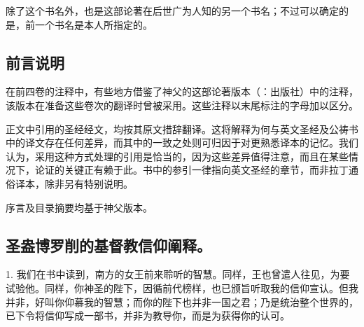 除了这个书名外，也是这部论著在后世广为人知的另一个书名；不过可以确定的是，前一个书名是本人所指定的。\par


\subsection{前言说明}

在前四卷的注释中，有些地方借鉴了神父的这部论著版本（：出版社）中的注释，该版本在准备这些卷次的翻译时曾被采用。这些注释以末尾标注的字母加以区分。\par

正文中引用的圣经经文，均按其原文措辞翻译。这将解释为何与英文圣经及公祷书中的译文存在任何差异，而其中的一致之处则可归因于对更熟悉译本的记忆。我们认为，采用这种方式处理的引用是恰当的，因为这些差异值得注意，而且在某些情况下，论证的关键正有赖于此。书中的参引一律指向英文圣经的章节，而非拉丁通俗译本，除非另有特别说明。\par

序言及目录摘要均基于神父版本。\par


\subsection{圣盎博罗削的基督教信仰阐释。}


\par

1. 我们在书中读到，南方的女王前来聆听的智慧。同样，王也曾遣人往见，为要试验他。同样，你神圣的陛下，因循前代榜样，也已颁旨听取我的信仰宣认。但我并非，好叫你仰慕我的智慧；而你的陛下也并非一国之君；乃是统治整个世界的，已下令将信仰写成一部书，并非为教导你，而是为获得你的认可。\par

